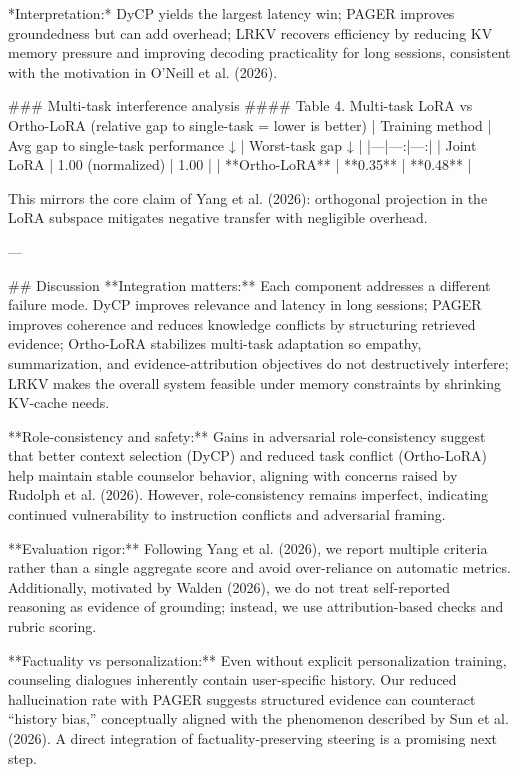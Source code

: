 *Interpretation:* DyCP yields the largest latency win; PAGER improves groundedness but can add overhead; LRKV recovers efficiency by reducing KV memory pressure and improving decoding practicality for long sessions, consistent with the motivation in O’Neill et al. (2026).

### Multi-task interference analysis  
#### Table 4. Multi-task LoRA vs Ortho-LoRA (relative gap to single-task = lower is better)  
| Training method | Avg gap to single-task performance ↓ | Worst-task gap ↓ |
|---|---:|---:|
| Joint LoRA | 1.00 (normalized) | 1.00 |
| **Ortho-LoRA** | **0.35** | **0.48** |

This mirrors the core claim of Yang et al. (2026): orthogonal projection in the LoRA subspace mitigates negative transfer with negligible overhead.

---

## Discussion  
**Integration matters:** Each component addresses a different failure mode. DyCP improves relevance and latency in long sessions; PAGER improves coherence and reduces knowledge conflicts by structuring retrieved evidence; Ortho-LoRA stabilizes multi-task adaptation so empathy, summarization, and evidence-attribution objectives do not destructively interfere; LRKV makes the overall system feasible under memory constraints by shrinking KV-cache needs.

**Role-consistency and safety:** Gains in adversarial role-consistency suggest that better context selection (DyCP) and reduced task conflict (Ortho-LoRA) help maintain stable counselor behavior, aligning with concerns raised by Rudolph et al. (2026). However, role-consistency remains imperfect, indicating continued vulnerability to instruction conflicts and adversarial framing.

**Evaluation rigor:** Following Yang et al. (2026), we report multiple criteria rather than a single aggregate score and avoid over-reliance on automatic metrics. Additionally, motivated by Walden (2026), we do not treat self-reported reasoning as evidence of grounding; instead, we use attribution-based checks and rubric scoring.

**Factuality vs personalization:** Even without explicit personalization training, counseling dialogues inherently contain user-specific history. Our reduced hallucination rate with PAGER suggests structured evidence can counteract “history bias,” conceptually aligned with the phenomenon described by Sun et al. (2026). A direct integration of factuality-preserving steering is a promising next step.

